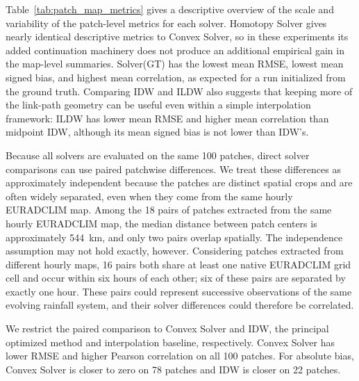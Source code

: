 \documentclass[11pt]{article}
\begin{document}

Table~\ref{tab:patch_map_metrics} gives a descriptive overview of the scale and variability of the patch-level metrics for each solver. Homotopy Solver gives nearly identical descriptive metrics to Convex Solver, so in these experiments its added continuation machinery does not produce an additional empirical gain in the map-level summaries. Solver(GT) has the lowest mean RMSE, lowest mean signed bias, and highest mean correlation, as expected for a run initialized from the ground truth. Comparing IDW and ILDW also suggests that keeping more of the link-path geometry can be useful even within a simple interpolation framework: ILDW has lower mean RMSE and higher mean correlation than midpoint IDW, although its mean signed bias is not lower than IDW's.

\begingroup\color{black}
Because all solvers are evaluated on the same 100 patches, direct solver comparisons can use paired patchwise differences. We treat these differences as approximately independent because the patches are distinct spatial crops and are often widely separated, even when they come from the same hourly EURADCLIM map. Among the 18 pairs of patches extracted from the same hourly EURADCLIM map, the median distance between patch centers is approximately \SI{544}{km}, and only two pairs overlap spatially. The independence assumption may not hold exactly, however. Considering patches extracted from different hourly maps, 16 pairs both share at least one native EURADCLIM grid cell and occur within six hours of each other; six of these pairs are separated by exactly one hour. These pairs could represent successive observations of the same evolving rainfall system, and their solver differences could therefore be correlated.

We restrict the paired comparison to Convex Solver and IDW, the principal optimized method and interpolation baseline, respectively. Convex Solver has lower RMSE and higher Pearson correlation on all 100 patches. For absolute bias, Convex Solver is closer to zero on 78 patches and IDW is closer on 22 patches.
\end{document}
